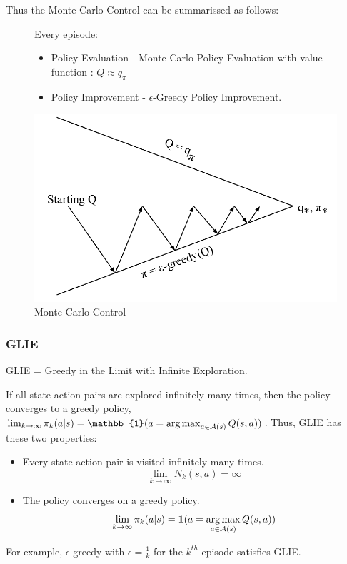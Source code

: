 Thus the Monte Carlo Control can be summarissed as follows:
\begin{figure}[H]
  \begin{minipage}{0.5\textwidth}
    Every episode:
      \begin{itemize}
          \item Policy Evaluation - Monte Carlo Policy Evaluation with value function : 
          \(Q \approx q_\pi \) 
          \item Policy Improvement - \(\epsilon \)-Greedy Policy Improvement.
        \end{itemize}
  \end{minipage}%
  \begin{minipage}{0.5\textwidth}
    \centering
    \includegraphics[width=\textwidth]{figures/mc-eps.png}
    \caption{Monte Carlo Control}
    \label{fig:mc-eps}
  \end{minipage}
\end{figure}

\subsubsection{GLIE}
GLIE = Greedy in the Limit with Infinite Exploration.

\begin{theorem}
  If all state-action pairs are explored infinitely many times, then the policy converges
  to a greedy policy, \(\lim_{k \to \infty} \pi_k(a|s) = \mathbb{1}(a = \argmax_{a \in
  \mathcal{A}(s)} Q(s,a))\).
  Thus, GLIE has these two properties:
  \begin{itemize}
    \item Every state-action pair is visited infinitely many times.
    \[
      \lim_{k \to \infty} N_k(s,a) = \infty
    \]
    \item The policy converges on a greedy policy.
    \[
      \lim_{k \to \infty} \pi_k(a|s) = \bm{1}(a = \operatorname*{arg\,max}_{a \in \mathcal{A}(s)} Q(s,a))
    \]
  \end{itemize}
\end{theorem}
For example, \(\epsilon\)-greedy with \(\epsilon = \frac{1}{k}\) for the \(k^{th}\) episode
satisfies GLIE.

